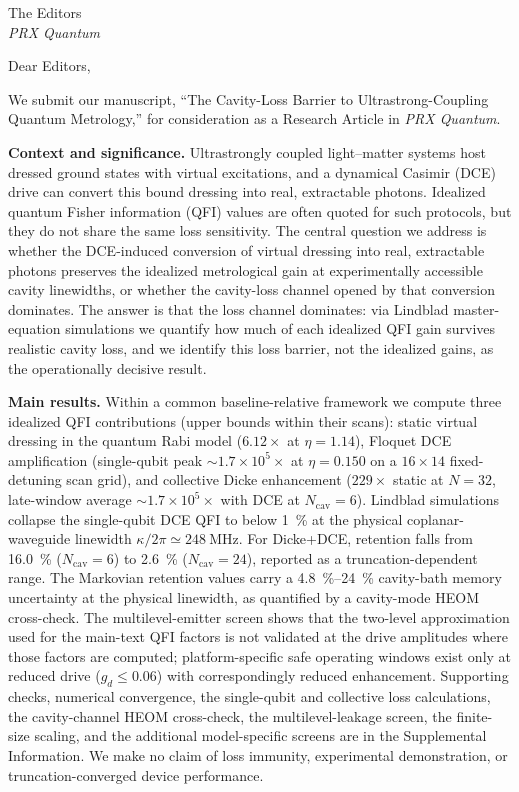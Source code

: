 \documentclass[11pt,a4paper]{letter}
\date{\today}
\begin{document}
\begin{letter}{The Editors\\ \textit{PRX Quantum}}
\opening{Dear Editors,}

We submit our manuscript, ``The Cavity-Loss Barrier to Ultrastrong-Coupling Quantum Metrology,'' for consideration as a Research Article in \textit{PRX Quantum}.

\textbf{Context and significance.} Ultrastrongly coupled light--matter systems host dressed ground states with virtual excitations, and a dynamical Casimir (DCE) drive can convert this bound dressing into real, extractable photons. Idealized quantum Fisher information (QFI) values are often quoted for such protocols, but they do not share the same loss sensitivity. The central question we address is whether the DCE-induced conversion of virtual dressing into real, extractable photons preserves the idealized metrological gain at experimentally accessible cavity linewidths, or whether the cavity-loss channel opened by that conversion dominates. The answer is that the loss channel dominates: via Lindblad master-equation simulations we quantify how much of each idealized QFI gain survives realistic cavity loss, and we identify this loss barrier, not the idealized gains, as the operationally decisive result.

\textbf{Main results.} Within a common baseline-relative framework we compute three idealized QFI contributions (upper bounds within their scans): static virtual dressing in the quantum Rabi model ($6.12\times$ at $\eta=1.14$), Floquet DCE amplification (single-qubit peak $\sim\!1.7\times10^{5}\times$ at $\eta=0.150$ on a $16\times14$ fixed-detuning scan grid), and collective Dicke enhancement ($229\times$ static at $N=32$, late-window average $\sim\!1.7\times10^{5}\times$ with DCE at $N_{\mathrm{cav}}=6$). Lindblad simulations collapse the single-qubit DCE QFI to below \qty{1}{\percent} at the physical coplanar-waveguide linewidth $\kappa/2\pi\simeq\qty{248}{\mega\hertz}$. For Dicke+DCE, retention falls from \qty{16.0}{\percent} ($N_{\mathrm{cav}}=6$) to \qty{2.6}{\percent} ($N_{\mathrm{cav}}=24$), reported as a truncation-dependent range. The Markovian retention values carry a \qty{4.8}{\percent}--\qty{24}{\percent} cavity-bath memory uncertainty at the physical linewidth, as quantified by a cavity-mode HEOM cross-check. The multilevel-emitter screen shows that the two-level approximation used for the main-text QFI factors is not validated at the drive amplitudes where those factors are computed; platform-specific safe operating windows exist only at reduced drive ($g_d\le0.06$) with correspondingly reduced enhancement. Supporting checks, numerical convergence, the single-qubit and collective loss calculations, the cavity-channel HEOM cross-check, the multilevel-leakage screen, the finite-size scaling, and the additional model-specific screens are in the Supplemental Information. We make no claim of loss immunity, experimental demonstration, or truncation-converged device performance.


\end{letter}
\end{document}
